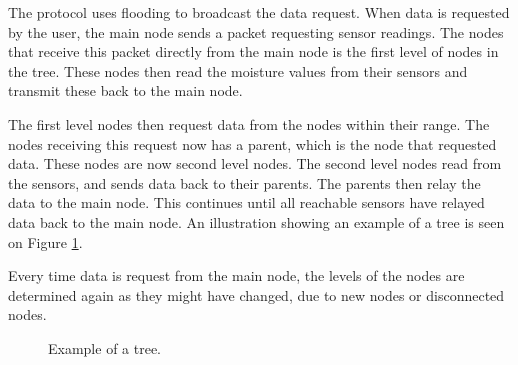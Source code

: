 
The protocol uses flooding to broadcast the data request. When data is requested by the user, the main node sends a packet requesting sensor readings. The nodes that receive this packet directly from the main node is the first level of nodes in the tree. These nodes then read the moisture values from their sensors and transmit these back to the main node. 

The first level nodes then request data from the nodes within their range. The nodes receiving this request now has a parent, which is the node that requested data. These nodes are now second level nodes. The second level nodes read from the sensors, and sends data back to their parents. The parents then relay the data to the main node. This continues until all reachable sensors have relayed data back to the main node.
An illustration showing an example of a tree is seen on Figure \ref{fig:prottree1}.

Every time data is request from the main node, the levels of the nodes are determined again as they might have changed, due to new nodes or disconnected nodes.

\begin{figure}[!h]
	\centering
	\caption{Example of a tree.}
	\label{fig:prottree1}
\end{figure}


